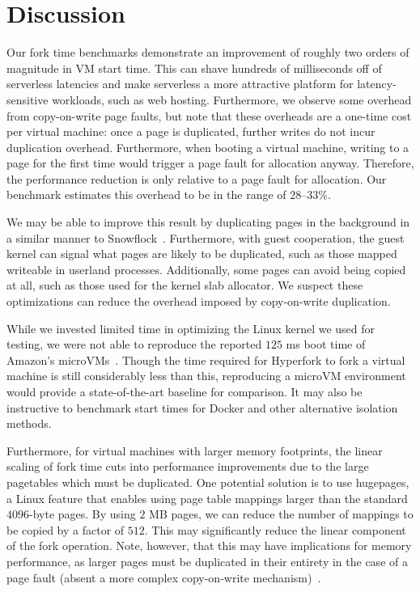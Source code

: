 \section{Discussion} \label{sec:discussion}

Our fork time benchmarks demonstrate an improvement of roughly two orders of
magnitude in VM start time. This can shave hundreds of milliseconds off of
serverless latencies and make serverless a more attractive platform for
latency-sensitive workloads, such as web hosting. Furthermore, we observe some
overhead from copy-on-write page faults, but note that these overheads are a
one-time cost per virtual machine: once a page is duplicated, further writes do
not incur duplication overhead. Furthermore, when booting a virtual machine,
writing to a page for the first time would trigger a page fault for allocation
anyway. Therefore, the performance reduction is only relative to a page fault
for allocation. Our benchmark estimates this overhead to be in the range of
$28$--$33$\%.

We may be able to improve this result by duplicating pages in the background in
a similar manner to Snowflock~\cite{snowflock}. Furthermore, with guest
cooperation, the guest kernel can signal what pages are likely to be
duplicated, such as those mapped writeable in userland processes. Additionally,
some pages can avoid being copied at all, such as those used for the kernel
slab allocator. We suspect these optimizations can reduce the overhead imposed
by copy-on-write duplication.

While we invested limited time in optimizing the Linux kernel we used for
testing, we were not able to reproduce the reported $125$ ms boot time of
Amazon's microVMs~\cite{firecracker-spec}. Though the time required for
Hyperfork to fork a virtual machine is still considerably less than this,
reproducing a microVM environment would provide a state-of-the-art baseline for
comparison. It may also be instructive to benchmark start times for Docker and
other alternative isolation methods.

Furthermore, for virtual machines with larger memory footprints, the linear
scaling of fork time cuts into performance improvements due to the large
pagetables which must be duplicated. One potential solution is to use
hugepages, a Linux feature that enables using page table mappings larger than
the standard $4096$-byte pages. By using $2$ MB pages, we can reduce the number
of mappings to be copied by a factor of $512$. This may significantly reduce
the linear component of the fork operation. Note, however, that this may have
implications for memory performance, as larger pages must be duplicated in
their entirety in the case of a page fault (absent a more complex copy-on-write
mechanism)~\cite{hugepages}.
